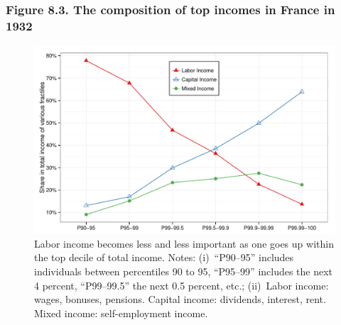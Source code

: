 \documentclass[t]{beamer}\usepackage[]{graphicx}\usepackage[]{color}
\newenvironment{knitrout}{}{} %
\begin{document}
\begin{frame}[label=Figure_8_3,fragile]
\frametitle{Figure 8.3. The composition of top incomes in France in 1932}
\begin{figure}[t]
\begin{minipage}[b]{\textwidth}
\centering
\begin{knitrout}\footnotesize
{}\color{fgcolor}

{\centering \includegraphics[width=1\linewidth]{figures/color/Figure_8_3} 

}



\end{knitrout}
\caption{Labor income becomes less and less important as one goes up within the top decile of total income. Notes: (i)~``P90--95'' includes individuals between percentiles 90 to 95, ``P95--99'' includes the next 4 percent, ``P99--99.5'' the next 0.5 percent, etc.; (ii)~Labor income: wages, bonuses, pensions. Capital income: dividends, interest, rent. Mixed income: self-employment income.}
\end{minipage}
\end{figure}
\end{frame}
\end{document}
